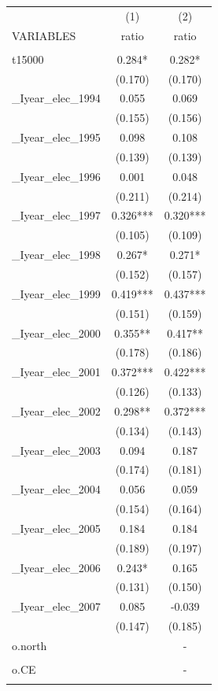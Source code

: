 \documentclass[]{article}
\begin{document}
\begin{tabular}{lcc} \hline
 & (1) & (2) \\
VARIABLES & ratio & ratio \\ \hline
 &  &  \\
t15000 & 0.284* & 0.282* \\
 & (0.170) & (0.170) \\
\_Iyear\_elec\_1994 & 0.055 & 0.069 \\
 & (0.155) & (0.156) \\
\_Iyear\_elec\_1995 & 0.098 & 0.108 \\
 & (0.139) & (0.139) \\
\_Iyear\_elec\_1996 & 0.001 & 0.048 \\
 & (0.211) & (0.214) \\
\_Iyear\_elec\_1997 & 0.326*** & 0.320*** \\
 & (0.105) & (0.109) \\
\_Iyear\_elec\_1998 & 0.267* & 0.271* \\
 & (0.152) & (0.157) \\
\_Iyear\_elec\_1999 & 0.419*** & 0.437*** \\
 & (0.151) & (0.159) \\
\_Iyear\_elec\_2000 & 0.355** & 0.417** \\
 & (0.178) & (0.186) \\
\_Iyear\_elec\_2001 & 0.372*** & 0.422*** \\
 & (0.126) & (0.133) \\
\_Iyear\_elec\_2002 & 0.298** & 0.372*** \\
 & (0.134) & (0.143) \\
\_Iyear\_elec\_2003 & 0.094 & 0.187 \\
 & (0.174) & (0.181) \\
\_Iyear\_elec\_2004 & 0.056 & 0.059 \\
 & (0.154) & (0.164) \\
\_Iyear\_elec\_2005 & 0.184 & 0.184 \\
 & (0.189) & (0.197) \\
\_Iyear\_elec\_2006 & 0.243* & 0.165 \\
 & (0.131) & (0.150) \\
\_Iyear\_elec\_2007 & 0.085 & -0.039 \\
 & (0.147) & (0.185) \\
o.north &  & - \\
 &  &  \\
o.CE &  & - \\
 &  &  \\

\end{tabular}
\end{document}
